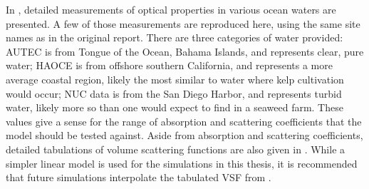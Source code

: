 In \citep{petzold_volume_1972}, detailed measurements of optical properties in various ocean waters are presented.
A few of those measurements are reproduced here, using the same site names as in the original report.
There are three categories of water provided: AUTEC is from Tongue of the Ocean, Bahama Islands,
and represents clear, pure water; HAOCE is from offshore southern California, and represents a more average coastal region,
likely the most similar to water where kelp cultivation would occur; NUC data is from the San Diego Harbor, and represents turbid water,
likely more so than one would expect to find in a seaweed farm.
These values give a sense for the range of absorption and scattering coefficients that the model should be tested against.
Aside from absorption and scattering coefficients, detailed tabulations of volume scattering functions are also given in \citep{petzold_volume_1972}.
While a simpler linear model is used for the simulations in this thesis, it is recommended that future simulations interpolate the tabulated VSF from \cite{petzold_volume_1972}.

